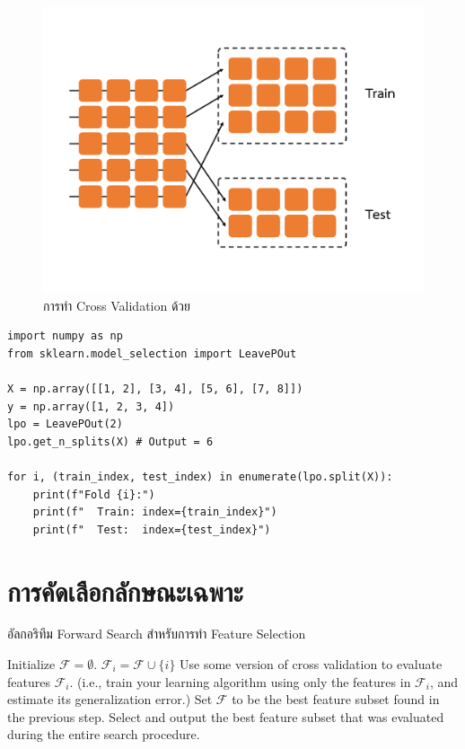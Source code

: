 \begin{figure}[H]
    \centering
    \includegraphics[width=0.9\linewidth,page=6]{fig/cross_validation.pdf}
    \caption{การทำ Cross Validation ด้วย }
    \label{fig:leave_p_out}
\end{figure}

\begin{lstlisting}[style=MyPython]
import numpy as np
from sklearn.model_selection import LeavePOut

X = np.array([[1, 2], [3, 4], [5, 6], [7, 8]])
y = np.array([1, 2, 3, 4])
lpo = LeavePOut(2)
lpo.get_n_splits(X) # Output = 6

for i, (train_index, test_index) in enumerate(lpo.split(X)):
    print(f"Fold {i}:")
    print(f"  Train: index={train_index}")
    print(f"  Test:  index={test_index}")
\end{lstlisting}

\section{การคัดเลือกลักษณะเฉพาะ}
\label{sec:select_feat}

\begin{algorithm}[ht]
    \caption{อัลกอริทึม Forward Search สำหรับการทำ Feature Selection}
    \label{alg:forward_search}
    \begin{algorithmic}
    \State Initialize $\mathcal{F} = \emptyset$.
    \Repeat
                \State $\mathcal{F}_i = \mathcal{F} \cup \{i\}$
                \State Use some version of cross validation to evaluate features $\mathcal{F}_i$.
                \State (i.e., train your learning algorithm using only the features in $\mathcal{F}_i$, and 
                estimate its generalization error.)
            \EndIf
        \EndFor
        \State Set $\mathcal{F}$ to be the best feature subset found in the previous step. %
    \State Select and output the best feature subset that was evaluated during the entire search procedure.
    \end{algorithmic}
\end{algorithm}

